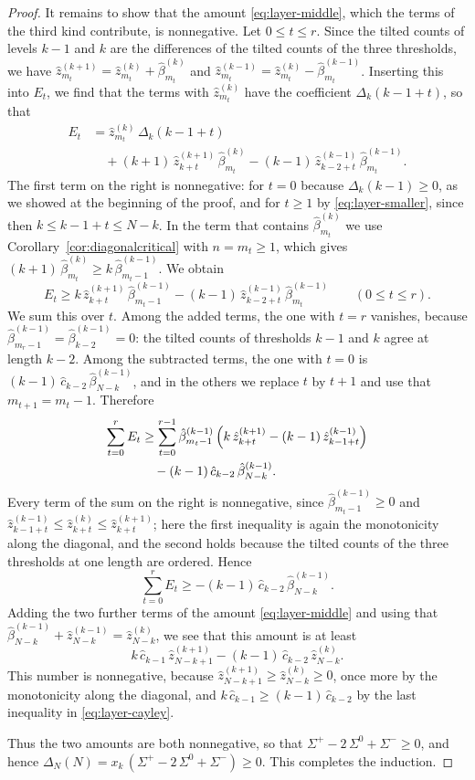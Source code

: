 \documentclass{amsart}
\theoremstyle{definition}
\theoremstyle{remark}
\numberwithin{equation}{section}
\begin{document}
\begin{proof}
It remains to show that the amount \eqref{eq:layer-middle}, which the terms of the third kind contribute, is nonnegative. Let $0\le t\le r$. Since the tilted counts of levels $k-1$ and $k$ are the differences of the tilted counts of the three thresholds, we have $\hat z^{(k+1)}_{m_t}=\hat z^{(k)}_{m_t}+\hat\beta^{(k)}_{m_t}$ and $\hat z^{(k-1)}_{m_t}=\hat z^{(k)}_{m_t}-\hat\beta^{(k-1)}_{m_t}$. Inserting this into $E_t$, we find that the terms with $\hat z^{(k)}_{m_t}$ have the coefficient $\Delta_k(k-1+t)$, so that
\begin{align*}
E_t&=\hat z^{(k)}_{m_t}\,\Delta_k(k-1+t)\\
&\quad+(k+1)\,\hat z^{(k+1)}_{k+t}\,\hat\beta^{(k)}_{m_t}-(k-1)\,\hat z^{(k-1)}_{k-2+t}\,\hat\beta^{(k-1)}_{m_t}.
\end{align*}
The first term on the right is nonnegative: for $t=0$ because $\Delta_k(k-1)\ge 0$, as we showed at the beginning of the proof, and for $t\ge 1$ by \eqref{eq:layer-smaller}, since then $k\le k-1+t\le N-k$. In the term that contains $\hat\beta^{(k)}_{m_t}$ we use Corollary~\ref{cor:diagonalcritical} with $n=m_t\ge 1$, which gives $(k+1)\,\hat\beta^{(k)}_{m_t}\ge k\,\hat\beta^{(k-1)}_{m_t-1}$. We obtain
\[
E_t\ge k\,\hat z^{(k+1)}_{k+t}\,\hat\beta^{(k-1)}_{m_t-1}-(k-1)\,\hat z^{(k-1)}_{k-2+t}\,\hat\beta^{(k-1)}_{m_t}\qquad(0\le t\le r).
\]
We sum this over $t$. Among the added terms, the one with $t=r$ vanishes, because $\hat\beta^{(k-1)}_{m_r-1}=\hat\beta^{(k-1)}_{k-2}=0$: the tilted counts of thresholds $k-1$ and $k$ agree at length $k-2$. Among the subtracted terms, the one with $t=0$ is $(k-1)\,\hat c_{k-2}\,\hat\beta^{(k-1)}_{N-k}$, and in the others we replace $t$ by $t+1$ and use that $m_{t+1}=m_t-1$. Therefore
\begin{align*}
\sum_{t=0}^{r}E_t&\ge\sum_{t=0}^{r-1}\hat\beta^{(k-1)}_{m_t-1}\,\Bigl(k\,\hat z^{(k+1)}_{k+t}-(k-1)\,\hat z^{(k-1)}_{k-1+t}\Bigr)\\
&\quad-(k-1)\,\hat c_{k-2}\,\hat\beta^{(k-1)}_{N-k}.
\end{align*}
Every term of the sum on the right is nonnegative, since $\hat\beta^{(k-1)}_{m_t-1}\ge 0$ and $\hat z^{(k-1)}_{k-1+t}\le\hat z^{(k)}_{k+t}\le\hat z^{(k+1)}_{k+t}$; here the first inequality is again the monotonicity along the diagonal, and the second holds because the tilted counts of the three thresholds at one length are ordered. Hence
\[
\sum_{t=0}^{r}E_t\ge-(k-1)\,\hat c_{k-2}\,\hat\beta^{(k-1)}_{N-k}.
\]
Adding the two further terms of the amount \eqref{eq:layer-middle} and using that $\hat\beta^{(k-1)}_{N-k}+\hat z^{(k-1)}_{N-k}=\hat z^{(k)}_{N-k}$, we see that this amount is at least
\[
k\,\hat c_{k-1}\,\hat z^{(k+1)}_{N-k+1}-(k-1)\,\hat c_{k-2}\,\hat z^{(k)}_{N-k}.
\]
This number is nonnegative, because $\hat z^{(k+1)}_{N-k+1}\ge\hat z^{(k)}_{N-k}\ge 0$, once more by the monotonicity along the diagonal, and $k\,\hat c_{k-1}\ge(k-1)\,\hat c_{k-2}$ by the last inequality in \eqref{eq:layer-cayley}.

Thus the two amounts are both nonnegative, so that $\Sigma^{+}-2\,\Sigma^{0}+\Sigma^{-}\ge 0$, and hence $\Delta_N(N)=x_k\,(\Sigma^{+}-2\,\Sigma^{0}+\Sigma^{-})\ge 0$. This completes the induction.
\end{proof}
\end{document}
